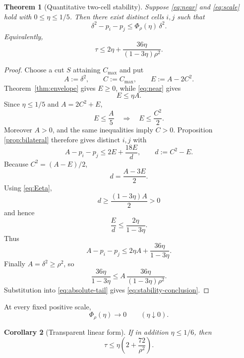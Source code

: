 \documentclass[11pt]{article}
\newtheorem{theorem}{Theorem}[section]
\newtheorem{corollary}[theorem]{Corollary}
\newcommand{\cmax}{C_{\max}}
\newcommand{\dd}{\delta}
\newcommand{\etaq}{\eta}
\newcommand{\tauq}{\tau}
\newcommand{\PhiRho}{\Phi_{\rho}}
\begin{document}
\begin{theorem}[Quantitative two-cell stability]\label{thm:stability}
Suppose \eqref{eq:near} and \eqref{eq:scale} hold with
$0\le\etaq\le1/5$.  Then there exist distinct cells $i,j$ such that
\begin{equation}\label{eq:stability-conclusion}
  \boxed{
  \dd^2-p_i-p_j
  \le
  \PhiRho(\etaq)\,\dd^2.
  }
\end{equation}
Equivalently,
\[
  \tauq\le
  2\etaq+
  \frac{36\etaq}{(1-3\etaq)\rho^2}.
\]
\end{theorem}

\begin{proof}
Choose a cut $S$ attaining $\cmax$ and put
\[
  A:=\dd^2,\qquad C:=\cmax,\qquad E:=A-2C^2.
\]
Theorem~\ref{thm:envelope} gives $E\ge0$, while
\eqref{eq:near} gives
\begin{equation}\label{eq:Eeta}
  E\le\etaq A.
\end{equation}
Since $\etaq\le1/5$ and $A=2C^2+E$,
\[
  E\le\frac A5
  \quad\Longrightarrow\quad
  E\le\frac{C^2}{2}.
\]
Moreover $A>0$, and the same inequalities imply $C>0$.  Proposition
\ref{prop:bilateral} therefore gives distinct $i,j$ with
\[
  A-p_i-p_j
  \le
  2E+\frac{18E}{d},
  \qquad
  d:=C^2-E.
\]
Because $C^2=(A-E)/2$,
\begin{equation}\label{eq:didentity}
  d=\frac{A-3E}{2}.
\end{equation}
Using \eqref{eq:Eeta},
\[
  d\ge\frac{(1-3\etaq)A}{2}>0
\]
and hence
\[
  \frac Ed
  \le
  \frac{2\etaq}{1-3\etaq}.
\]
Thus
\begin{equation}\label{eq:absolute-tail}
  A-p_i-p_j
  \le
  2\etaq A+
  \frac{36\etaq}{1-3\etaq}.
\end{equation}
Finally $A=\dd^2\ge\rho^2$, so
\[
  \frac{36\etaq}{1-3\etaq}
  \le
  A\,
  \frac{36\etaq}{(1-3\etaq)\rho^2}.
\]
Substitution into \eqref{eq:absolute-tail} gives
\eqref{eq:stability-conclusion}.
\end{proof}

At every fixed positive scale,
\[
  \PhiRho(\etaq)\longrightarrow0
  \qquad(\etaq\downarrow0).
\]

\begin{corollary}[Transparent linear form]\label{cor:linear}
If in addition $\etaq\le1/6$, then
\begin{equation}\label{eq:linear}
  \boxed{
    \tauq\le
    \etaq\left(2+\frac{72}{\rho^2}\right).
  }
\end{equation}
\end{corollary}
\end{document}
